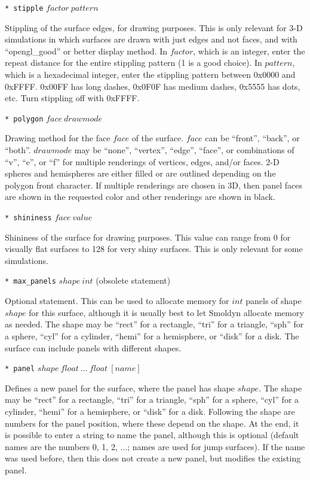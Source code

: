 \documentclass {book}
\newcommand {\ttt} {\texttt}
\begin{document}
\begin{description}
\item{\ttt{* stipple} $factor\ pattern$}

Stippling of the surface edges, for drawing purposes. This is only relevant for 3-D simulations in which surfaces are drawn with just edges and not faces, and with ``opengl\_good'' or better display method. In $factor$, which is an integer, enter the repeat distance for the entire stippling pattern (1 is a good choice). In $pattern$, which is a hexadecimal integer, enter the stippling pattern between 0x0000 and 0xFFFF. 0x00FF has long dashes, 0x0F0F has medium dashes, 0x5555 has dots, etc. Turn stippling off with 0xFFFF.

\item{\ttt{* polygon} $face\ drawmode$}

Drawing method for the face $face$ of the surface. $face$ can be ``front'', ``back'', or ``both''. $drawmode$ may be ``none'', ``vertex'', ``edge'', ``face'', or combinations of ``v'', ``e'', or ``f'' for multiple renderings of vertices, edges, and/or faces. 2-D spheres and hemispheres are either filled or are outlined depending on the polygon front character. If multiple renderings are chosen in 3D, then panel faces are shown in the requested color and other renderings are shown in black.

\item{\ttt{* shininess} $face\ value$}

Shininess of the surface for drawing purposes. This value can range from 0 for visually flat surfaces to 128 for very shiny surfaces. This is only relevant for some simulations.

\item{\ttt{* max\_panels} $shape\ int$ (obsolete statement)}

Optional statement. This can be used to allocate memory for $int$ panels of shape $shape$ for this surface, although it is usually best to let Smoldyn allocate memory as needed. The shape may be ``rect'' for a rectangle, ``tri'' for a triangle, ``sph'' for a sphere, ``cyl'' for a cylinder, ``hemi'' for a hemisphere, or ``disk'' for a disk. The surface can include panels with different shapes.

\item{\ttt{* panel} $shape\ float\ ...\ float\ [name]$}

Defines a new panel for the surface, where the panel has shape $shape$.  The shape may be ``rect'' for a rectangle, ``tri'' for a triangle, ``sph'' for a sphere, ``cyl'' for a cylinder, ``hemi'' for a hemisphere, or ``disk'' for a disk. Following the shape are numbers for the panel position, where these depend on the shape. At the end, it is possible to enter a string to name the panel, although this is optional (default names are the numbers 0, 1, 2, ...; names are used for jump surfaces). If the name was used before, then this does not create a new panel, but modifies the existing panel.


\end{description}
\end{document}
